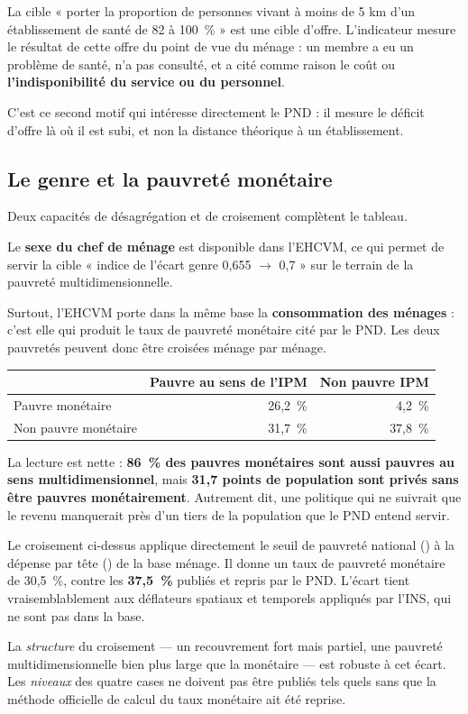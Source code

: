 \documentclass[11pt,a4paper]{article}
\begin{document}
La cible « porter la proportion de personnes vivant à moins de 5 km d'un établissement de santé de
82 à 100~\% » est une cible d'offre. L'indicateur  mesure le résultat de
cette offre du point de vue du ménage : un membre a eu un problème de santé, n'a pas consulté, et
a cité comme raison le coût ou \textbf{l'indisponibilité du service ou du personnel}.

C'est ce second motif qui intéresse directement le PND : il mesure le déficit d'offre là où il est
subi, et non la distance théorique à un établissement.

\subsection{Le genre et la pauvreté monétaire}

Deux capacités de désagrégation et de croisement complètent le tableau.

Le \textbf{sexe du chef de ménage} est disponible dans l'EHCVM, ce qui permet de servir la cible
« indice de l'écart genre 0,655 $\to$ 0,7 » sur le terrain de la pauvreté multidimensionnelle.

Surtout, l'EHCVM porte dans la même base la \textbf{consommation des ménages} : c'est elle qui
produit le taux de pauvreté monétaire cité par le PND. Les deux pauvretés peuvent donc être
croisées ménage par ménage.

\begin{center}
\begin{tabular}{@{}lrr@{}}
\toprule
& \textbf{Pauvre au sens de l'IPM} & \textbf{Non pauvre IPM} \\
\midrule
Pauvre monétaire & 26,2~\% & 4,2~\% \\
Non pauvre monétaire & 31,7~\% & 37,8~\% \\
\bottomrule
\end{tabular}
\end{center}

La lecture est nette : \textbf{86~\% des pauvres monétaires sont aussi pauvres au sens
multidimensionnel}, mais \textbf{31,7 points de population sont privés sans être pauvres
monétairement}. Autrement dit, une politique qui ne suivrait que le revenu manquerait près d'un
tiers de la population que le PND entend servir.

\begin{attention}
Le croisement ci-dessus applique directement le seuil de pauvreté national () à la
dépense par tête () de la base ménage. Il donne un taux de pauvreté monétaire de
30,5~\%, contre les \textbf{37,5~\%} publiés et repris par le PND. L'écart tient vraisemblablement
aux déflateurs spatiaux et temporels appliqués par l'INS, qui ne sont pas dans la base.

La \emph{structure} du croisement --- un recouvrement fort mais partiel, une pauvreté
multidimensionnelle bien plus large que la monétaire --- est robuste à cet écart. Les
\emph{niveaux} des quatre cases ne doivent pas être publiés tels quels sans que la méthode
officielle de calcul du taux monétaire ait été reprise.
\end{attention}
\end{document}
